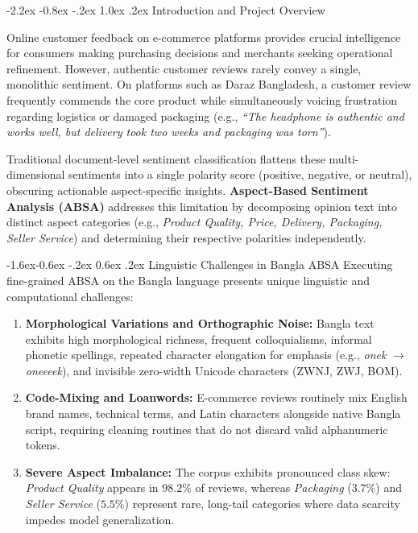 \documentclass[12pt,a4paper]{article}
\makeatletter
\renewcommand{\section}{\@startsection{section}{1}{\z@}%
  {-2.2ex \@plus -0.8ex \@minus -.2ex}%
  {1.0ex \@plus.2ex}%
  {\normalfont\LARGE\bfseries}}
\renewcommand{\subsection}{\@startsection{subsection}{2}{\z@}%
  {-1.6ex\@plus -0.6ex \@minus -.2ex}%
  {0.6ex \@plus .2ex}%
  {\normalfont\Large\bfseries}}
\makeatother
\begin{document}
\section{Introduction and Project Overview}
\label{sec:intro}

Online customer feedback on e-commerce platforms provides crucial intelligence for consumers making purchasing decisions and merchants seeking operational refinement. However, authentic customer reviews rarely convey a single, monolithic sentiment. On platforms such as Daraz Bangladesh, a customer review frequently commends the core product while simultaneously voicing frustration regarding logistics or damaged packaging (e.g., \textit{``The headphone is authentic and works well, but delivery took two weeks and packaging was torn''}).

Traditional document-level sentiment classification flattens these multi-dimensional sentiments into a single polarity score (positive, negative, or neutral), obscuring actionable aspect-specific insights. \textbf{Aspect-Based Sentiment Analysis (ABSA)} addresses this limitation by decomposing opinion text into distinct aspect categories (e.g., \textit{Product Quality, Price, Delivery, Packaging, Seller Service}) and determining their respective polarities independently.

\subsection{Linguistic Challenges in Bangla ABSA}
Executing fine-grained ABSA on the Bangla language presents unique linguistic and computational challenges:
\begin{enumerate}
    \item \textbf{Morphological Variations and Orthographic Noise:} Bangla text exhibits high morphological richness, frequent colloquialisms, informal phonetic spellings, repeated character elongation for emphasis (e.g., \textit{onek} $\to$ \textit{oneeeek}), and invisible zero-width Unicode characters (ZWNJ, ZWJ, BOM).
    \item \textbf{Code-Mixing and Loanwords:} E-commerce reviews routinely mix English brand names, technical terms, and Latin characters alongside native Bangla script, requiring cleaning routines that do not discard valid alphanumeric tokens.
    \item \textbf{Severe Aspect Imbalance:} The corpus exhibits pronounced class skew: \textit{Product Quality} appears in $98.2\%$ of reviews, whereas \textit{Packaging} ($3.7\%$) and \textit{Seller Service} ($5.5\%$) represent rare, long-tail categories where data scarcity impedes model generalization.
\end{enumerate}
\end{document}
